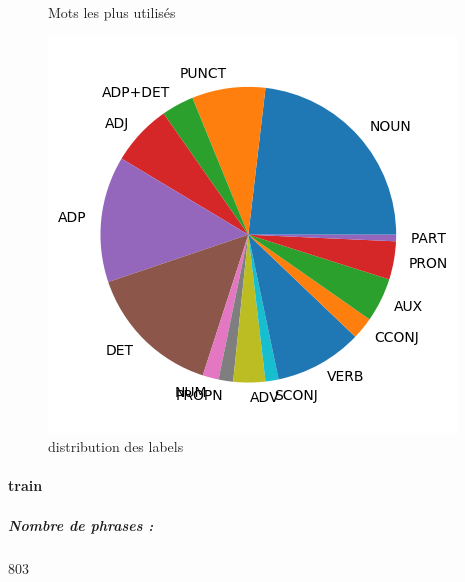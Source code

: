 \begin{figure}[H]
\begin{minipage}{0.48\textwidth}
\begin{tabular}{|l || *{11 }{|c} |}
\end{tabular}
\caption{ Mots les plus utilisés } \label{Fig:muw}\end{minipage} 
\begin{minipage}{0.48\textwidth} \centering
\includegraphics[width=.7\linewidth]{partuttest_img.png}
\caption{distribution des labels}
\end{minipage}
\end{figure} \paragraph{train } 
\subparagraph{Nombre de phrases :} 803\\ 
